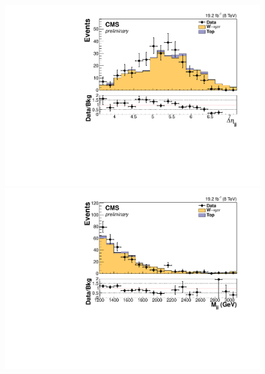 \begin{figure}
  \includegraphics[width=.65\largefigwidth]{plots/parked/HIG-14-038-figs/output_sigreg/munu_dijet_deta.pdf}
  \includegraphics[width=.65\largefigwidth]{plots/parked/HIG-14-038-figs/output_sigreg/munu_dijet_M.pdf}


\end{figure}
